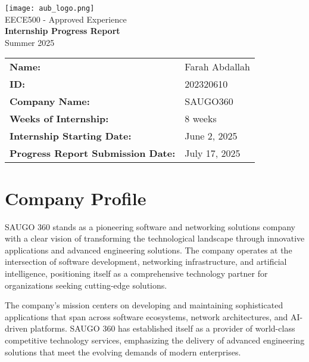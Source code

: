 \documentclass[12pt,a4paper]{article}
\begin{document}
\begin{titlepage}
\centering
\vspace*{1cm}
\texttt{[image: aub\_logo.png]}\\[0.5cm]
{\large EECE500 - Approved Experience}\\[1cm]
{\LARGE\bfseries Internship Progress Report}\\[0.5cm]
{\large Summer 2025}\\[2cm]
\begin{flushleft}
\begin{tabular}{@{}ll}
\textbf{Name:} & Farah Abdallah \\[0.3cm]
\textbf{ID:} & 202320610 \\[0.3cm]
\textbf{Company Name:} & SAUGO360 \\[0.3cm]
\textbf{Weeks of Internship:} & 8 weeks \\[0.3cm]
\textbf{Internship Starting Date:} & June 2, 2025 \\[0.3cm]
\textbf{Progress Report Submission Date:} & July 17, 2025 \\[0.3cm]
\end{tabular}
\end{flushleft}
\vfill
\end{titlepage}

\newpage
\tableofcontents
\newpage

\section{Company Profile}

SAUGO 360 stands as a pioneering software and networking solutions company with a clear vision of transforming the technological landscape through innovative applications and advanced engineering solutions. The company operates at the intersection of software development, networking infrastructure, and artificial intelligence, positioning itself as a comprehensive technology partner for organizations seeking cutting-edge solutions.

The company's mission centers on developing and maintaining sophisticated applications that span across software ecosystems, network architectures, and AI-driven platforms. SAUGO 360 has established itself as a provider of world-class competitive technology services, emphasizing the delivery of advanced engineering solutions that meet the evolving demands of modern enterprises.
\end{document}
